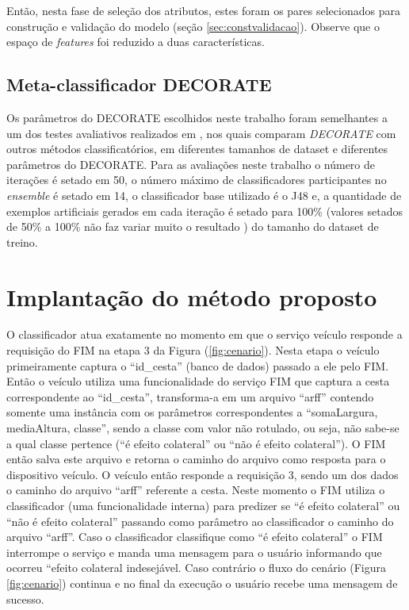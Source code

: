 Então, nesta fase de seleção dos atributos, estes foram os pares selecionados para construção e validação do modelo (seção \ref{sec:constvalidacao}). Observe que o espaço de \textit{features} foi reduzido a duas características.

\subsection{Meta-classificador DECORATE}
Os parâmetros do DECORATE escolhidos neste trabalho foram semelhantes a um dos testes avaliativos realizados em \cite{Melville:2004}, nos quais comparam \textit{DECORATE} com outros métodos classificatórios, em diferentes tamanhos de dataset e diferentes parâmetros do DECORATE. Para as avaliações neste trabalho o número de iterações é setado em 50, o número máximo de classificadores participantes no \textit{ensemble} é setado em 14, o classificador base utilizado é o J48 e, a quantidade de exemplos artificiais gerados em cada iteração é setado para 100\% (valores setados de 50\% a 100\% não faz variar muito o resultado \cite{Melville:2004}) do tamanho do dataset de treino.

\section{Implantação do método proposto}
\label{sec:implmetprop}
O classificador atua exatamente no momento em que o serviço veículo responde a requisição do FIM na etapa 3 da Figura (\ref{fig:cenario}). Nesta etapa o veículo primeiramente captura o ``id\_cesta'' (banco de dados) passado a ele pelo FIM. Então o veículo utiliza uma funcionalidade do serviço FIM que captura a cesta correspondente ao ``id\_cesta'', transforma-a em um arquivo ``arff'' contendo somente uma instância com os parâmetros correspondentes a ``somaLargura, mediaAltura, classe'', sendo a classe com valor não rotulado, ou seja, não sabe-se a qual classe pertence (``é efeito colateral'' ou ``não é efeito colateral''). O FIM então salva este arquivo e retorna o caminho do arquivo como resposta para o dispositivo veículo. O veículo então responde a requisição 3, sendo um dos dados o caminho do arquivo ``arff'' referente a cesta. Neste momento o FIM utiliza o classificador (uma funcionalidade interna) para predizer se ``é efeito colateral'' ou ``não é efeito colateral'' passando como parâmetro ao classificador o caminho do arquivo ``arff''. Caso o classificador classifique como ``é efeito colateral'' o FIM interrompe o serviço e manda uma mensagem para o usuário informando que ocorreu ``efeito colateral indesejável. Caso contrário o fluxo do cenário (Figura \ref{fig:cenario}) continua e no final da execução o usuário recebe uma mensagem de sucesso.
